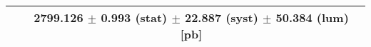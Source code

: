 \begin{tabular}{lc}
\hline
                               & 2799.126 $\pm$ 0.993 (stat) $\pm$ 22.887 (syst) $\pm$ 50.384 (lum) [pb]  \\
\hline
\end{tabular}
